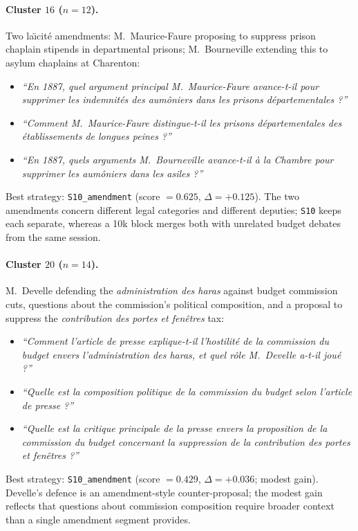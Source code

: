 \paragraph{Cluster $16$ ($n=12$).}
Two la\"{\i}cit\'{e} amendments: M.~Maurice-Faure proposing to suppress prison
chaplain stipends in departmental prisons; M.~Bourneville extending this to
asylum chaplains at Charenton:
\begin{itemize}
  \item \textit{``En 1887, quel argument principal M.~Maurice-Faure avance-t-il
    pour supprimer les indemnit\'{e}s des aum\^{o}niers dans les prisons
    d\'{e}partementales ?''}
  \item \textit{``Comment M.~Maurice-Faure distingue-t-il les prisons
    d\'{e}partementales des \'{e}tablissements de longues peines ?''}
  \item \textit{``En 1887, quels arguments M.~Bourneville avance-t-il \`{a} la
    Chambre pour supprimer les aum\^{o}niers dans les asiles ?''}
\end{itemize}
Best strategy: \texttt{S10\_amendment} (score $= 0.625$, $\Delta = +0.125$).
The two amendments concern different legal categories and different deputies;
\texttt{S10} keeps each separate, whereas a 10k block merges both with unrelated
budget debates from the same session.

\paragraph{Cluster $20$ ($n=14$).}
M.~Develle defending the \emph{administration des haras} against budget
commission cuts, questions about the commission's political composition, and a
proposal to suppress the \emph{contribution des portes et fen\^{e}tres} tax:
\begin{itemize}
  \item \textit{``Comment l'article de presse explique-t-il l'hostilit\'{e} de la
    commission du budget envers l'administration des haras, et quel r\^{o}le
    M.~Develle a-t-il jou\'{e} ?''}
  \item \textit{``Quelle est la composition politique de la commission du budget
    selon l'article de presse ?''}
  \item \textit{``Quelle est la critique principale de la presse envers la
    proposition de la commission du budget concernant la suppression de la
    contribution des portes et fen\^{e}tres ?''}
\end{itemize}
Best strategy: \texttt{S10\_amendment} (score $= 0.429$, $\Delta = +0.036$; modest
gain).
Develle's defence is an amendment-style counter-proposal; the modest gain reflects
that questions about commission composition require broader context than a single
amendment segment provides.

